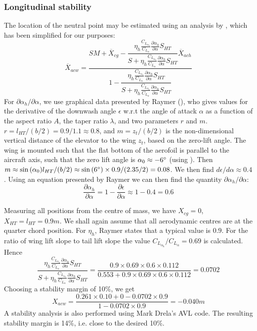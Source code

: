 \subsubsection{Longitudinal stability}
The location of the neutral point may be estimated using an analysis by \cite[p. 417]{raymer}, which has been simplified for our purposes:
\begin{equation}
	\overline{X}_{acw}=\dfrac{SM+\overline{X}_{cg}-\dfrac{\eta_h\frac{C_{L_{\alpha_h}}}{C_{L_\alpha}}\frac{\partial\alpha_h}{\partial\alpha}S_{HT}}{S+\eta_h\frac{C_{L_{\alpha_h}}}{C_{L_\alpha}}\frac{\partial\alpha_h}{\partial\alpha}S_{HT}}\overline{X}_{ach}}{1-\dfrac{\eta_h\frac{C_{L_{\alpha_h}}}{C_{L_\alpha}}\frac{\partial\alpha_h}{\partial\alpha}S_{HT}}{S+\eta_h\frac{C_{L_{\alpha_h}}}{C_{L_\alpha}}\frac{\partial\alpha_h}{\partial\alpha}S_{HT}}}
\end{equation}
For $\partial \alpha_h/\partial \alpha$, we use graphical data presented by Raymer (\cite[pp. 426-427]{raymer}), who gives values for the derivative of the downwash angle $\epsilon$ w.r.t the angle of attack $\alpha$ as a function of the aspect ratio $A$, the taper ratio $\lambda$, and two parameters $r$ and $m$. $r=l_{HT}/(b/2)=0.9/1.1\approx 0.8$, and $m=z_t/(b/2)$ is the non-dimensional vertical distance of the elevator to the wing $z_t$, based on the zero-lift angle. The wing is mounted such that the flat bottom of the aerofoil is parallel to the aircraft axis, such that the zero lift angle is $\alpha_0\approx -6\degree$ (using \cite[p. 83]{airfoildata}). Then $m\approx \sin{(\alpha_0)}l_{HT}/(b/2)\approx \sin{(6\degree)}\times 0.9/(2.35/2)=0.08$. We then find $d\epsilon/d\alpha\approx 0.4$. Using an equation presented by Raymer we can then find the quantity $\partial \alpha_h/\partial \alpha$:
\begin{equation}
  \dfrac{\partial\alpha_h}{\partial\alpha}=1-\dfrac{\partial\epsilon}{\partial\alpha}\approx 1-0.4=0.6
\end{equation}

Measuring all positions from the centre of mass, we have $X_{cg}=0$, $X_{HT}=l_{HT}=0.9\si{m}$. We shall again assume that all aerodynamic centres are at the quarter chord position. For $\eta_h$, Raymer states that a typical value is $0.9$. For the ratio of wing lift slope to tail lift slope the value $C_{L_{\alpha_h}}/C_{L_\alpha}=0.69$ is calculated. Hence
\begin{equation}
  \dfrac{\eta_h\frac{C_{L_{\alpha_h}}}{C_{L_\alpha}}\frac{\partial\alpha_h}{\partial\alpha}S_{HT}}{S+\eta_h\frac{C_{L_{\alpha_h}}}{C_{L_\alpha}}\frac{\partial\alpha_h}{\partial\alpha}S_{HT}}=\dfrac{0.9\times 0.69\times 0.6\times 0.112}{0.553+0.9\times 0.69\times 0.6\times 0.112}=0.0702
\end{equation}
Choosing a stability margin of 10\%, we get
\begin{equation}
  X_{acw}=\dfrac{0.261\times 0.10+0-0.0702\times 0.9} {1-0.0702\times 0.9}=-0.040\si{m}
\end{equation}
A stability analysis is also performed using Mark Drela's AVL code. The resulting stability margin is 14\%, i.e. close to the desired 10\%.

